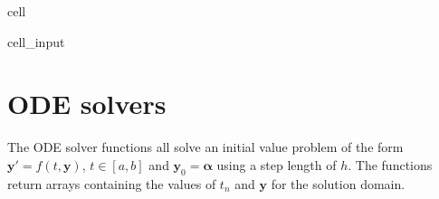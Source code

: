 \documentclass[letterpaper,10pt,english]{jupyterBook}
\begin{document}
\begin{sphinxuseclass}{cell}\begin{sphinxVerbatimInput}

\begin{sphinxuseclass}{cell_input}
\begin{sphinxVerbatim}[commandchars=\\\{\}]
   
   
   
   
\end{sphinxVerbatim}

\end{sphinxuseclass}\end{sphinxVerbatimInput}

\end{sphinxuseclass}

\section{ODE solvers}
\label{\detokenize{8_Appendices/8.1_Python:ode-solvers}}
\sphinxAtStartPar
The ODE solver functions all solve an initial value problem of the form \(\mathbf{y}' = f(t, \mathbf{y})\), \(t \in [a, b]\) and \(\mathbf{y}_0 = \mathbf{\alpha}\) using a step length of \(h\). The functions return arrays containing the values of \(t_n\) and \(\mathbf{y}\) for the solution domain.
\end{document}
